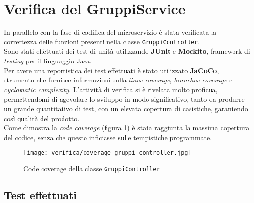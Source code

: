 \section{Verifica del GruppiService}
In parallelo con la fase di codifica del \gls{microservizio}  è stata verificata la correttezza delle funzioni presenti nella classe \texttt{GruppiController}. \\
Sono stati effettuati dei test di unità utilizzando \textbf{JUnit} e \textbf{Mockito}, \gls{framework} di \textit{testing} per il linguaggio Java.\\
Per avere una reportistica dei test effettuati è stato utilizzato \textbf{JaCoCo}, strumento che fornisce informazioni sulla \textit{lines coverage}, \textit{branches coverage} e \textit{cyclomatic complexity}. 
L'attività di verifica si è rivelata molto proficua, permettendomi di agevolare lo sviluppo in modo significativo, tanto da produrre un
grande quantitativo di test, con un elevata copertura di casistiche, garantendo così qualità del prodotto.\\
Come dimostra la \textit{code coverage} (figura \ref{img:code-coverage}) è stata raggiunta la massima copertura del codice, senza che questo inficiasse sulle tempistiche programmate.

\begin{figure}[H] 
    \centerline{\texttt{[image: verifica/coverage-gruppi-controller.jpg]}} 
    \caption{Code coverage della classe \texttt{GruppiController}}
    \label{img:code-coverage}
\end{figure}

\subsection{Test effettuati}










